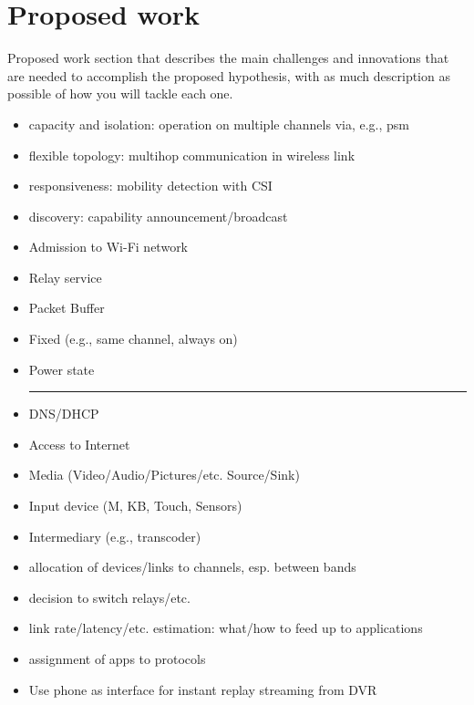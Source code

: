 \section{Proposed work}
\label{sec:proposed}
Proposed work section that describes the main challenges and
innovations that are needed to accomplish the proposed hypothesis, with
as much description as possible of how you will tackle each one.

\begin{itemize}
\item capacity and isolation: operation on multiple channels via, e.g., psm
\item flexible topology: multihop communication in wireless link
\item responsiveness: mobility detection with CSI
\item discovery: capability announcement/broadcast
\end{itemize}

\begin{itemize}
\item Admission to Wi-Fi network
\item Relay service
\item Packet Buffer
\item Fixed (e.g., same channel, always on)
\item Power state\\
\hrule
\item DNS/DHCP
\item Access to Internet
\item Media (Video/Audio/Pictures/etc. Source/Sink)
\item Input device (M, KB, Touch, Sensors)
\item Intermediary (e.g., transcoder)
\end{itemize}

\begin{itemize}
\item allocation of devices/links to channels, esp. between bands
\item decision to switch relays/etc.
\item link rate/latency/etc. estimation: what/how to feed up to applications
\item assignment of apps to protocols
\end{itemize}

\begin{itemize}
\item Use phone as interface for instant replay streaming from DVR
\end{itemize}